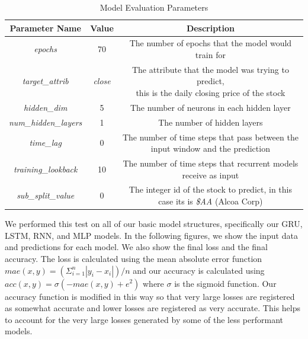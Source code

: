 \documentclass{article}
\begin{document}
    \begin{table}[H]
        \begin{center}
            \caption{{Model Evaluation Parameters}}
            \label{tab:evalParams}
            \bgroup
            \def\arraystretch{1.2}
            \begin{tabular}{|c|c|c|}
                \hline
                \textbf{Parameter Name} & \textbf{Value} & \textbf{Description}\\
                \hline
                \textit{epochs} & 70 & The number of epochs that the model would train for\\
                \hline
                \textit{target\_attrib} & \textit{close} & \makecell{The attribute that the model was trying to predict,\\this is the daily closing price of the stock}\\
                \hline
                \textit{hidden\_dim} & 5 & The number of neurons in each hidden layer\\
                \hline
                \textit{num\_hidden\_layers} & 1 & The number of hidden layers\\
                \hline
                \textit{time\_lag} & 0 & The number of time steps that pass between the input window and the prediction\\
                \hline
                \textit{training\_lookback} & 10 & The number of time steps that recurrent models receive as input\\
                \hline
                \textit{sub\_split\_value} & 0 & The integer id of the stock to predict, in this case its is \textit{\$AA} (Alcoa Corp)\\
                \hline
            \end{tabular}
            \egroup
        \end{center}
    \end{table}

    We performed this test on all of our basic model structures, specifically our GRU, LSTM, RNN, and MLP models.
    In the following figures, we show the input data and predictions for each model.  We also show the final loss
    and the final accuracy.  The loss is calculated using the mean absolute error function
    $mae(x, y) = (\Sigma^n_{i=1} |y_i - x_i|) / n$ and our accuracy is calculated using
    $acc(x, y) = \sigma(-mae(x, y)+e^2)$ where $\sigma$ is the sigmoid function.  Our accuracy function is modified
    in this way so that very large losses are registered as somewhat accurate and lower losses are registered as
    very accurate.  This helps to account for the very large losses generated by some of the less performant models.
\end{document}
